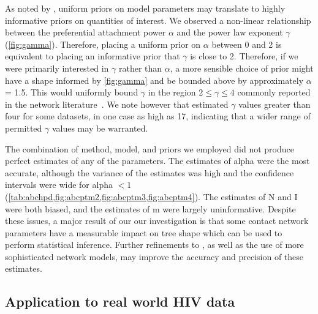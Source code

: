 As noted by \textcite{lintusaari2016identifiability}, uniform priors on model
parameters may translate to highly informative priors on quantities of
interest. We observed a non-linear relationship between the preferential
attachment power $\alpha$ and the power law exponent $\gamma$
(\cref{fig:gamma}). Therefore, placing a uniform prior on $\alpha$ between 0
and 2 is equivalent to placing an informative prior that $\gamma$ is close to
2. Therefore, if we were primarily interested in $\gamma$ rather than
$\alpha$, a more sensible choice of prior might have a shape informed by
\cref{fig:gamma} and be bounded above by approximately $\alpha$ = 1.5. This
would uniformly bound $\gamma$ in the region $2 \leq \gamma \leq 4$ commonly
reported in the network literature~\autocite{liljeros2001web,
schneeberger2004scale, colgate1989risk, brown2011transmission}. We note however
that \textcite{jones2003assessment} estimated $\gamma$ values greater than
four for some datasets, in one case as high as 17, indicating that a wider
range of permitted $\gamma$ values may be warranted.

The combination of method, model, and priors we employed did not produce
perfect estimates of any of the parameters. The estimates of \gls{alpha} were
the most accurate, although the variance of the estimates was high and the
confidence intervals were wide for \gls{alpha} $< 1$
(\cref{tab:abchpd,fig:abcptm2,fig:abcptm3,fig:abcptm4}). The estimates of
\gls{N} and \gls{I} were both biased, and the estimates of \gls{m} were largely
uninformative. Despite these issues, a major result of our our investigation is
that some contact network parameters have a measurable impact on tree shape
which can be used to perform statistical inference. Further refinements to
, as well as the use of more sophisticated network models, may
improve the accuracy and precision of these estimates.

\subsection{Application to real world HIV data}

